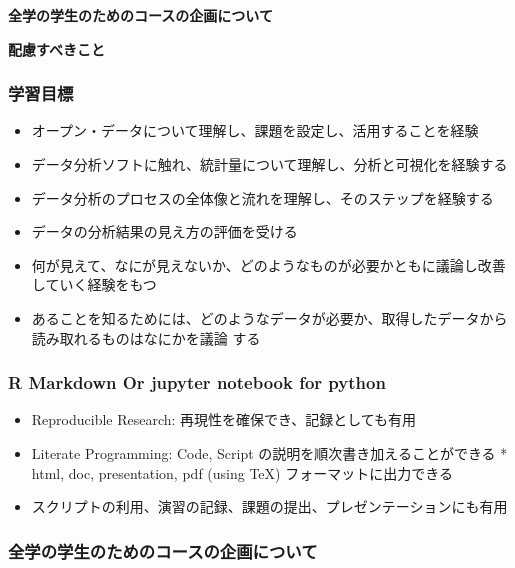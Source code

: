 \documentclass[
]{book}
\providecommand{\tightlist}{%
  \setlength{\itemsep}{0pt}\setlength{\parskip}{0pt}}
\theoremstyle{definition}
\theoremstyle{definition}
\theoremstyle{definition}
\theoremstyle{definition}
\theoremstyle{remark}
\begin{document}
\textbf{全学の学生のためのコースの企画について}

\textbf{配慮すべきこと}

\hypertarget{ux5b66ux7fd2ux76eeux6a19}{%
\subsubsection{学習目標}\label{ux5b66ux7fd2ux76eeux6a19}}

\begin{itemize}
\tightlist
\item
  オープン・データについて理解し、課題を設定し、活用することを経験
\item
  データ分析ソフトに触れ、統計量について理解し、分析と可視化を経験する
\item
  データ分析のプロセスの全体像と流れを理解し、そのステップを経験する
\item
  データの分析結果の見え方の評価を受ける
\item
  何が見えて、なにが見えないか、どのようなものが必要かともに議論し改善していく経験をもつ
\item
  あることを知るためには、どのようなデータが必要か、取得したデータから読み取れるものはなにかを議論 する
\end{itemize}

\hypertarget{r-markdown-or-jupyter-notebook-for-python}{%
\subsubsection{R Markdown Or jupyter notebook for python}\label{r-markdown-or-jupyter-notebook-for-python}}

\begin{itemize}
\tightlist
\item
  Reproducible Research: 再現性を確保でき、記録としても有用
\item
  Literate Programming: Code, Script の説明を順次書き加えることができる * html, doc, presentation, pdf (using TeX) フォーマットに出力できる
\item
  スクリプトの利用、演習の記録、課題の提出、プレゼンテーションにも有用
\end{itemize}

\hypertarget{ux5168ux5b66ux306eux5b66ux751fux306eux305fux3081ux306eux30b3ux30fcux30b9ux306eux4f01ux753bux306bux3064ux3044ux3066}{%
\subsubsection{全学の学生のためのコースの企画について}\label{ux5168ux5b66ux306eux5b66ux751fux306eux305fux3081ux306eux30b3ux30fcux30b9ux306eux4f01ux753bux306bux3064ux3044ux3066}}
\end{document}
